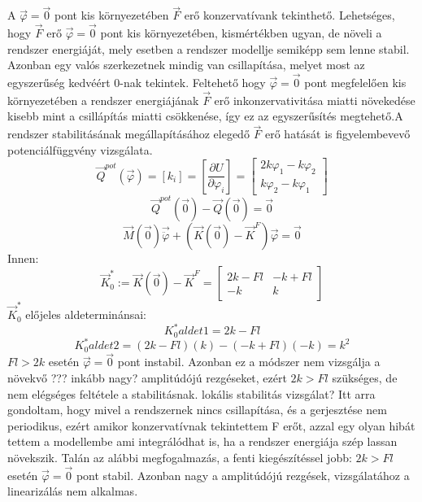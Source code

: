 \documentclass[12pt,twoside]{article}
\begin{document}
A $\vec \varphi=\vec 0$ pont kis környezetében $\vec F$ erő konzervatívank tekinthető.{\color{blue} Lehetséges, hogy $\vec F$ erő $\vec \varphi=\vec 0$ pont kis környezetében, kismértékben ugyan, de növeli a rendszer energiáját, mely esetben a rendszer modellje semiképp sem lenne stabil. Azonban egy valós szerkezetnek mindig van csillapítása, melyet most az egyszerűség kedvéért 0-nak tekintek. Feltehető hogy $\vec \varphi=\vec 0$ pont megfelelően kis környezetében a rendszer energiájának $\vec F$ erő inkonzervativitása miatti növekedése kisebb mint a csillápítás miatti csökkenése, így ez az egyszerűsítés megtehető.\newline}A rendszer stabilitásának megállapításához elegedő $\vec F$ erő hatását is figyelembevevő  potenciálfüggvény vizsgálata.
\begin{equation} \label{eq:Newton}
\vec Q^{pot}(\vec\varphi) =[k_{i}]=\left[ \frac{\partial U}{\partial \varphi_i }\right]=
\begin{bmatrix}
2k \varphi_1 - k \varphi_2\\
k \varphi_2 - k \varphi_1
\end{bmatrix}
\end{equation}
\begin{equation}\label{eq:Newton}
\vec Q^{pot}(\vec 0)-\vec Q(\vec 0)=\vec 0
\end{equation}
\begin{equation} \label{eq:Newton}
\vec M(\vec 0) \vec{\ddot\varphi}+(\vec K(\vec 0)-\vec K^{F}) \vec{\varphi}=\vec 0
\end{equation}
Innen:
\begin{equation} \label{eq:Newton}
\vec K_0^*:=\vec K(\vec 0)-\vec K^{F}=
\begin{bmatrix}
2k-Fl & -k+Fl\\
-k & k
\end{bmatrix} 
\end{equation}
$\vec K_0^*$ előjeles aldeterminánsai:
\begin{equation} \label{eq:Newton}
K_0^*{aldet 1}=2k-Fl
\end{equation}
\begin{equation} \label{eq:Newton}
K_0^*{aldet 2}=(2k-Fl)(k)-(-k+Fl)(-k)=k^2
\end{equation}
$Fl>2k$ esetén $\vec \varphi=\vec 0$ pont instabil. Azonban ez a módszer nem vizsgálja a növekvő {\color{red}??? inkább nagy?} amplitúdójú rezgéseket, ezért $2k>Fl$ szükséges, de nem elégséges feltétele a stabilitásnak. {\color{red} lokális stabilitás vizsgálat?}
{\newline \color{blue} Itt arra gondoltam, hogy mivel a rendszernek nincs csillapítása, és a gerjesztése nem periodikus, ezért amikor konzervatívnak tekintettem F erőt, azzal egy olyan hibát tettem a modellembe ami integrálódhat is, ha a rendszer energiája szép lassan növekszik. Talán az alábbi megfogalmazás, a fenti kiegészítéssel jobb:\newline
$2k>Fl$ esetén $\vec \varphi=\vec 0$ pont stabil. Azonban nagy a amplitúdójú rezgések, vizsgálatához a linearizálás nem alkalmas.}
\end{document}
